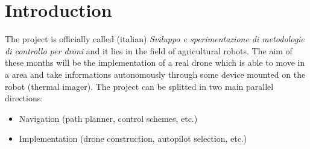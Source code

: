 \section{Introduction}

The project is officially called (italian) \textit{Sviluppo e sperimentazione di metodologie di controllo per droni} and it lies in the field of agricultural robots. The aim of these months will be the implementation of a real drone which is able to move in a area and take informations autonomously through some device mounted on the robot (thermal imager). The project can be splitted in two main parallel directions:
\begin{itemize}
	\item Navigation (path planner, control schemes, etc.)
	\item Implementation (drone construction, autopilot selection, etc.)
\end{itemize}
